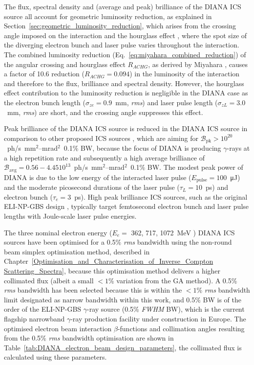 \documentclass[../main.tex]{subfiles}
\begin{document}
The flux, spectral density and (average and peak) brilliance of the DIANA ICS source all account for geometric luminosity reduction, as explained in Section~\ref{sec:geometric_luminosity_reduction}, which arises from the crossing angle imposed on the interaction and the hourglass effect \cite{furman1991hourglass}, where the spot size of the diverging electron bunch and laser pulse varies throughout the interaction. The combined luminosity reduction (Eq.~\ref{eq:miyahara_combined_reduction}) of the angular crossing and hourglass effect $R_{ACHG}$, as derived by Miyahara \cite{miyahara2008luminosity}, causes a factor of 10.6 reduction ($R_{ACHG}=0.094$) in the luminosity of the interaction and therefore to the flux, brilliance and spectral density. However, the hourglass effect contribution to the luminosity reduction is negligible in the DIANA case as the electron bunch length ($\sigma_{ze}=0.9$~\si{\milli\meter}, \textit{rms}) and laser pulse length ($\sigma_{zL}=3.0$~\si{\milli\meter}, \textit{rms}) are short, and the crossing angle suppresses this effect.

Peak brilliance of the DIANA ICS source is reduced in the DIANA ICS source in comparison to other proposed ICS sources \cite{barty2011overview}, which are aiming for $\mathcal{B}_{\mathrm{pk}}>10^{20}$~ph/\si{\second}~\si{\milli\meter}$^{2}$--\si{\milli\radian}$^{2}$~0.1\% BW,  because the focus of DIANA is producing $\gamma$-rays at a high repetition rate and subsequently a high average brilliance of $\mathcal{B}_{\mathrm{avg}}=0.56-4.4510^{13}$~ph/\si{\second}~\si{\milli\meter}$^{2}$--\si{\milli\radian}$^{2}$~0.1\% BW. The modest peak power of DIANA is due to the low energy of the interacted laser pulse ($E_{\mathrm{pulse}} = 100$~\si{\micro\joule}) and the moderate picosecond durations of the laser pulse ($\tau_{L}=10$~\si{\pico\second}) and electron bunch ($\tau_{e}=3$~\si{\pico\second}). High peak brilliance ICS sources, such as the original ELI-NP-GBS design \cite{adriani2014technical}, typically target femtosecond electron bunch and laser pulse lengths with Joule-scale laser pulse energies. 

The three nominal electron energy ($E_{e}=$ 362, 717, 1072~\si{\mega\electronvolt} ) DIANA ICS sources have been optimised for a 0.5\% \textit{rms} bandwidth using the non-round beam simplex optimisation method, described in Chapter~\ref{Optimisation_and_Characterisation_of_Inverse_Compton Scattering_Spectra}, because this optimisation method delivers a higher collimated flux (albeit a small $<1$\% variation from the GA method). A 0.5\% \textit{rms} bandwidth has been selected because this is within the $<1$\% \textit{rms} bandwidth limit designated as narrow bandwidth within this work, and 0.5\%  BW is of the order of the ELI-NP-GBS $\gamma$-ray source \cite{elinp2019vega,tanaka2020current} (0.5\% \textit{FWHM} BW), which is the current flagship narrowband $\gamma$-ray production facility under construction in Europe. The optimised electron beam interaction $\beta$-functions and collimation angles resulting from the 0.5\% \textit{rms} bandwidth optimisation are shown in Table~\ref{tab:DIANA_electron_beam_design_parameters}, the collimated flux is calculated using these parameters.
\end{document}
